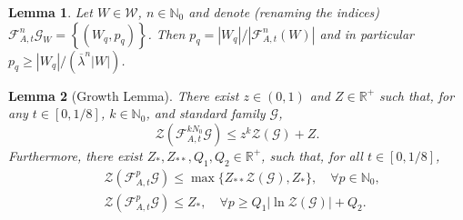 \documentclass[10pt,a4paper]{amsart}
\newtheorem{lemma}{Lemma}
\newcommand\bN{{\mathbb N}}
\newcommand\bR{{\mathbb R}}
\newcommand\cF{{\mathcal F}}
\newcommand\cG{{\mathcal G}}
\newcommand\cW{{\mathcal W}}
\newcommand\cZ{{\mathcal Z}}
\newcommand{\catt}{\cF_{A,t}}
\renewcommand{\ge}{\geqslant}
\renewcommand{\le}{\leqslant}
\begin{document}
\begin{lemma}\label{lem:weigths-single-curve}
 Let \(W \in \cW\), \(n \in \bN_0\) and denote (renaming the indices) \(\catt^n \cG_{W} = \left\{(W_q, p_q)\right\}\). Then \(p_q = |W_q|/|\catt^n (W)|\) and in particular \(p_q \ge  |W_q|/(\overline \lambda^n |W|)\).
\end{lemma} 

\begin{lemma}[Growth Lemma]\label{lem:growth-lemma}
  There exist \(z \in (0,1)\) and \(Z \in \bR^+\) such that, for any \(t \in [0, 1/8]\), \(k \in \bN_0\), and standard family \(\cG\),
  \[
      \cZ(\catt^{k N_0} \cG) \le z^k \cZ (\cG) + Z.
  \]
  Furthermore, there exist \(Z_{*}, Z_{**}, Q_1,Q_2 \in \bR^+\), such that, for all \(t \in [0, 1/8]\),
  \[
  \begin{split}
    &\cZ(\catt^{p}\cG) \le \max\{Z_{**}\cZ(\cG), Z_{*}\}, \quad \forall p \in \bN_0,\\
    &\cZ(\catt^{p}\cG) \le Z_{*}, \quad \forall p \ge Q_1\left|\ln \cZ(\cG)\right| + Q_2.
  \end{split}
  \]
\end{lemma}
\end{document}
